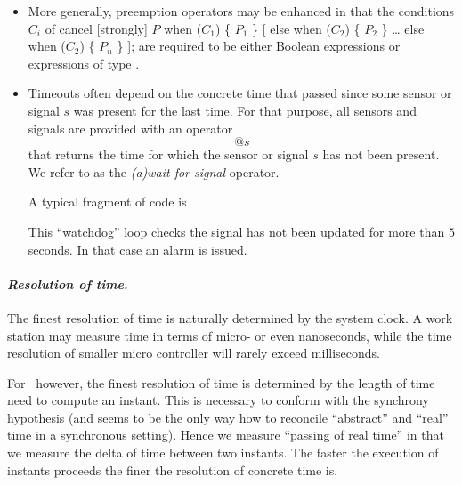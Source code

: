 {\begin{itemize}
	\item More generally, preemption operators may be enhanced in that the
	conditions $C_{i}$ of
	\BEP
	    cancel [strongly] 
	       $P$
	    when ($C_{1}$) \{ $P_{1}$ \}
	    [ else when ($C_{2}$) \{ $P_{2}$ \}
	      \ldots
	      else when ($C_{2}$) \{ $P_{n}$ \}
	    ];      
	\EEP
	are required to be either Boolean expressions or expressions of
	type .

  \item Timeouts often depend on the concrete time that passed since 
   some sensor or signal $s$ was present for the last time.
   For that purpose, all sensors and signals
   are provided with an operator
       $$\texttt{@}s$$
    that returns the time for which the sensor or signal $s$ has not been    
    present. We refer to  as the \emph{(a)wait-for-signal} operator.
    
    A typical fragment of code is 
    \begin{quote}
     \end{quote}
   This ``watchdog'' loop checks the signal  has not been
   updated for more than $5$ seconds.  In that case an alarm  is       
   issued.
%   

\end{itemize}

\paragraph{\textit{Resolution of time.}} The finest resolution of time is
naturally determined by the system clock. A work station may measure time in
terms of micro- or even nanoseconds, while the time resolution of 
smaller micro controller will rarely exceed milliseconds. 

For \se\ however, the finest resolution of time is determined by the length of time need to compute an instant. This is necessary to conform with the synchrony hypothesis (and seems to be the only way how to reconcile ``abstract'' and ``real'' time in a synchronous setting). Hence we measure ``passing of real time'' in that we measure the delta of time between two instants. The faster the execution of instants proceeds the finer the resolution of concrete time is.

}
